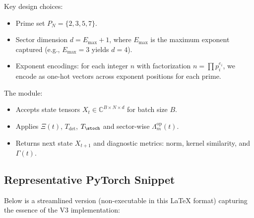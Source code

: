 \documentclass[11pt]{article}
\begin{document}
Key design choices:
\begin{itemize}[leftmargin=1.5em]
\item Prime set $P_N = \{2,3,5,7\}$.
\item Sector dimension $d = E_{\max}+1$, where $E_{\max}$ is the maximum exponent captured (e.g., $E_{\max}=3$ yields $d=4$).
\item Exponent encodings: for each integer $n$ with factorization $n=\prod p_i^{e_i}$, we encode as one-hot vectors across exponent positions for each prime.
\end{itemize}

The module:
\begin{itemize}[leftmargin=1.5em]
\item Accepts state tensors $X_t\in\mathbb{C}^{B\times N\times d}$ for batch size $B$.
\item Applies $\Xi(t)$, $T_{\det}$, $T_{\stoch}$ and sector-wise $\Lambda_m^{\mathrm{op}}(t)$.
\item Returns next state $X_{t+1}$ and diagnostic metrics: norm, kernel similarity, and $\Gamma(t)$.
\end{itemize}

\subsection{Representative PyTorch Snippet}

Below is a streamlined version (non-executable in this LaTeX format) capturing the essence of the V3 implementation:
\end{document}
